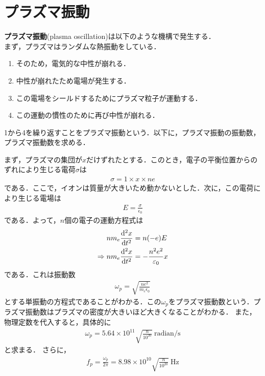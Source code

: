 \documentclass{report}
\begin{document}
\section{プラズマ振動}
\textbf{プラズマ振動}(plasma oscillation)は以下のような機構で発生する．\\
まず，プラズマはランダムな熱振動をしている．
\begin{enumerate}
  \item そのため，電気的な中性が崩れる．
  \item 中性が崩れたため電場が発生する．
  \item この電場をシールドするためにプラズマ粒子が運動する．
  \item この運動の慣性のために再び中性が崩れる．
\end{enumerate}
1から4を繰り返すことをプラズマ振動という．以下に，プラズマ振動の振動数，プラズマ振動数を求める．

まず，プラズマの集団が$x$だけずれたとする．このとき，電子の平衡位置からのずれにより生じる電荷$\sigma$は
\begin{align}
  \sigma = 1 \times x \times ne
\end{align}
である．ここで，イオンは質量が大きいため動かないとした．次に，この電荷により生じる電場は
\begin{align}
  E = \frac{\sigma}{\epsilon_0}
\end{align}
である．よって，$n$個の電子の運動方程式は
\begin{align}
  nm_e\dv[2]{x}{t} &= n(-e)E\\
  \Rightarrow nm_e \dv[2]{x}{t} &= -\frac{n^2e^2}{\varepsilon_0}x \label{plasma-oscillation}
\end{align}
である．これは振動数
\begin{align}
  \omega_p = \sqrt{\frac{ne^2}{m_e\epsilon_0}}
\end{align}
とする単振動の方程式であることがわかる．この$\omega_p$をプラズマ振動数という．プラズマ振動数はプラズマの密度が大きいほど大きくなることがわかる．
また，物理定数を代入すると，具体的に
\begin{align}
  \omega_p = 5.64 \times 10^{11} \sqrt{\frac{n}{10^{20}}} \ \text{radian/s}
\end{align}
と求まる．
さらに，
\begin{align}
  f_p = \frac{\omega_p}{2\pi} = 8.98 \times 10^{10} \sqrt{\frac{n}{10^{20}}} \ \text{Hz}
\end{align}
\end{document}
